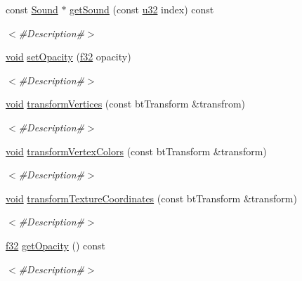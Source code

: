 \begin{DoxyCompactItemize}
const \mbox{\hyperlink{classnjli_1_1_sound}{Sound}} $\ast$ \mbox{\hyperlink{classnjli_1_1_node_a4d6aa88b18a3bc0a4c7f912a36933ca4}{get\+Sound}} (const \mbox{\hyperlink{_util_8h_a10e94b422ef0c20dcdec20d31a1f5049}{u32}} index) const
\begin{DoxyCompactList}\small\item\em $<$\#\+Description\#$>$ \end{DoxyCompactList}\item 
\mbox{\hyperlink{_thread_8h_af1e856da2e658414cb2456cb6f7ebc66}{void}} \mbox{\hyperlink{classnjli_1_1_node_a6ce7d73fab5d4d42fe3be0edb00898f0}{set\+Opacity}} (\mbox{\hyperlink{_util_8h_a5f6906312a689f27d70e9d086649d3fd}{f32}} opacity)
\begin{DoxyCompactList}\small\item\em $<$\#\+Description\#$>$ \end{DoxyCompactList}\item 
\mbox{\hyperlink{_thread_8h_af1e856da2e658414cb2456cb6f7ebc66}{void}} \mbox{\hyperlink{classnjli_1_1_node_aa46eb060cb1055d933b0b0908b8c416d}{transform\+Vertices}} (const bt\+Transform \&transfrom)
\begin{DoxyCompactList}\small\item\em $<$\#\+Description\#$>$ \end{DoxyCompactList}\item 
\mbox{\hyperlink{_thread_8h_af1e856da2e658414cb2456cb6f7ebc66}{void}} \mbox{\hyperlink{classnjli_1_1_node_afac33e777f9b0c7ad816e646258750af}{transform\+Vertex\+Colors}} (const bt\+Transform \&transform)
\begin{DoxyCompactList}\small\item\em $<$\#\+Description\#$>$ \end{DoxyCompactList}\item 
\mbox{\hyperlink{_thread_8h_af1e856da2e658414cb2456cb6f7ebc66}{void}} \mbox{\hyperlink{classnjli_1_1_node_a2ff7b1e0ec98a5ca99fb2633a7a936aa}{transform\+Texture\+Coordinates}} (const bt\+Transform \&transform)
\begin{DoxyCompactList}\small\item\em $<$\#\+Description\#$>$ \end{DoxyCompactList}\item 
\mbox{\hyperlink{_util_8h_a5f6906312a689f27d70e9d086649d3fd}{f32}} \mbox{\hyperlink{classnjli_1_1_node_ad399157554c53eaee612b8bce47bdf26}{get\+Opacity}} () const
\begin{DoxyCompactList}\small\item\em $<$\#\+Description\#$>$ \end{DoxyCompactList}\item 

\end{DoxyCompactItemize}
